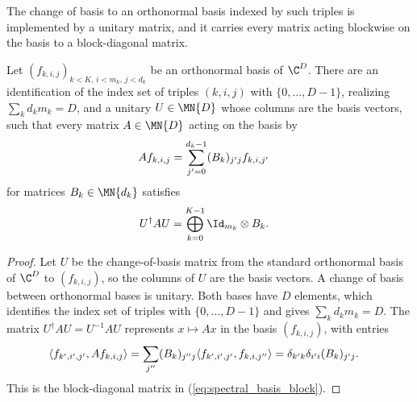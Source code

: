 The change of basis to an orthonormal basis indexed by such triples is
implemented by a unitary matrix, and it carries every matrix acting
blockwise on the basis to a block-diagonal matrix.

\begin{lemma}%
    \label{lem:starSubalgebra_unitary_change_of_basis_block}
    \leanok
    Let $(f_{k,i,j})_{k<K,\,i<m_k,\,j<d_k}$ be an orthonormal basis of
    $\C^D$. There are an identification of the index set of triples
    $(k,i,j)$ with $\{0,\ldots,D-1\}$, realizing
    $\sum_kd_km_k=D$, and a unitary $U\in\MN{D}$ whose columns are the
    basis vectors, such that every matrix $A\in\MN{D}$ acting on the basis
    by
    \begin{align}
        A f_{k,i,j}
        &=\sum_{j'=0}^{d_k-1}(B_k)_{j'j}f_{k,i,j'}
        \notag
    \end{align}
    for matrices $B_k\in\MN{d_k}$ satisfies
    \begin{align}
        U^\dagger A U
        &=\bigoplus_{k=0}^{K-1}\Id_{m_k}\otimes B_k.
        \label{eq:spectral_basis_block}
    \end{align}
\end{lemma}

\begin{proof}
    \leanok
    Let $U$ be the change-of-basis matrix from the standard orthonormal
    basis of $\C^D$ to $(f_{k,i,j})$, so the columns of $U$ are the basis
    vectors. A change of basis between orthonormal bases is unitary. Both
    bases have $D$ elements, which identifies the index set of triples with
    $\{0,\ldots,D-1\}$ and gives $\sum_kd_km_k=D$. The matrix
    $U^\dagger AU=U^{-1}AU$ represents $x\mapsto Ax$ in the basis
    $(f_{k,i,j})$, with entries
    \begin{align}
        \langle f_{k',i',j'},Af_{k,i,j}\rangle
        &=\sum_{j''}(B_k)_{j''j}
          \langle f_{k',i',j'},f_{k,i,j''}\rangle
          =\delta_{k'k}\delta_{i'i}(B_k)_{j'j}.
        \notag
    \end{align}
    This is the block-diagonal matrix in
    (\ref{eq:spectral_basis_block}).
\end{proof}

